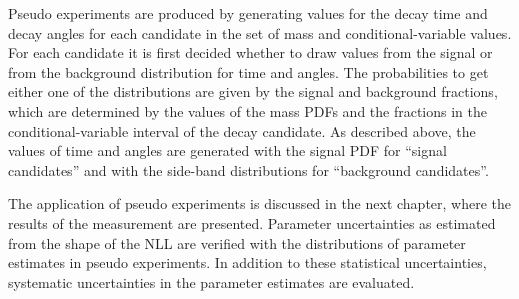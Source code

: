 Pseudo experiments are produced by generating values for the decay time and decay angles for each candidate in the set of mass and
conditional-variable values. For each candidate it is first decided whether to draw values from the signal or from the background
distribution for time and angles. The probabilities to get either one of the distributions are given by the signal and background
fractions, which are determined by the values of the mass PDFs and the fractions in the conditional-variable interval of the decay
candidate.  As described above, the values of time and angles are generated with the signal PDF for ``signal candidates'' and with the
side-band distributions for ``background candidates''.

The application of pseudo experiments is discussed in the next chapter, where the results of the \BstoJpsiKK{} measurement are presented.
Parameter uncertainties as estimated from the shape of the NLL are verified with the distributions of parameter estimates in pseudo
experiments. In addition to these statistical uncertainties, systematic uncertainties in the parameter estimates are evaluated.
